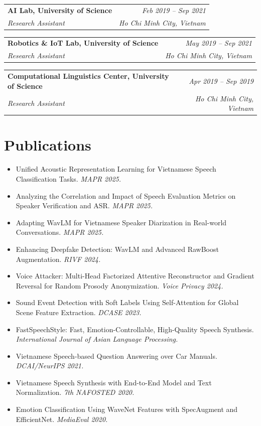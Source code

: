 \documentclass[10pt,a4paper]{article}
\makeatletter
\newcommand{\cventry}[4]{%
  \noindent
  \begin{tabular*}{\linewidth}{@{}l@{\extracolsep{\fill}}r@{}}
    {\color{accent}\textbf{#1}} & \textit{\small #2} \\
    \textit{\small #3} & \textit{\small #4}
  \end{tabular*}%
  \vspace{1pt}%
}
\makeatother
\begin{document}
\vspace{4pt}
\cventry{AI Lab, University of Science}{Feb 2019 -- Sep 2021}
        {Research Assistant}{Ho Chi Minh City, Vietnam}
\vspace{-2pt}{\small Built a 10\,GB Vietnamese speech corpus; researched text normalization and phonology.}

\vspace{4pt}
\cventry{Robotics \& IoT Lab, University of Science}{May 2019 -- Sep 2021}
        {Research Assistant}{Ho Chi Minh City, Vietnam}
\vspace{-2pt}{\small Teaching assistant and coach for EVJ Makethon, FLL, and WRO robotics competitions.}

\vspace{4pt}
\cventry{Computational Linguistics Center, University of Science}{Apr 2019 -- Sep 2019}
        {Research Assistant}{Ho Chi Minh City, Vietnam}
\vspace{-2pt}{\small Teaching assistant guiding SDL Trados Studio for the English Linguistics faculty (USSH).}

\section{Publications}

\begin{itemize}
  \item Unified Acoustic Representation Learning for Vietnamese Speech Classification Tasks. \textit{MAPR 2025.}
  \item Analyzing the Correlation and Impact of Speech Evaluation Metrics on Speaker Verification and ASR. \textit{MAPR 2025.}
  \item Adapting WavLM for Vietnamese Speaker Diarization in Real-world Conversations. \textit{MAPR 2025.}
  \item Enhancing Deepfake Detection: WavLM and Advanced RawBoost Augmentation. \textit{RIVF 2024.}
  \item Voice Attacker: Multi-Head Factorized Attentive Reconstructor and Gradient Reversal for Random Prosody Anonymization. \textit{Voice Privacy 2024.}
  \item Sound Event Detection with Soft Labels Using Self-Attention for Global Scene Feature Extraction. \textit{DCASE 2023.}
  \item FastSpeechStyle: Fast, Emotion-Controllable, High-Quality Speech Synthesis. \textit{International Journal of Asian Language Processing.}
  \item Vietnamese Speech-based Question Answering over Car Manuals. \textit{DCAI/NeurIPS 2021.}
  \item Vietnamese Speech Synthesis with End-to-End Model and Text Normalization. \textit{7th NAFOSTED 2020.}
  \item Emotion Classification Using WaveNet Features with SpecAugment and EfficientNet. \textit{MediaEval 2020.}
\end{itemize}
\end{document}
